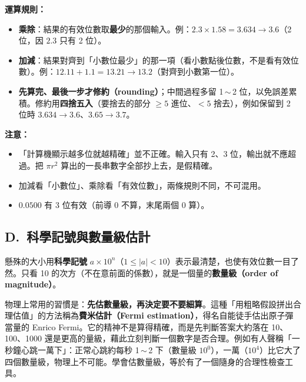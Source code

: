 \documentclass[11pt]{article}
\begin{document}
\textbf{運算規則：}
\begin{itemize}\setlength{\itemsep}{1pt}
\item \textbf{乘除}：結果的有效位數取\textbf{最少}的那個輸入。例：$2.3\times1.58=3.634\to3.6$（2 位，因 $2.3$ 只有 2 位）。
\item \textbf{加減}：結果對齊到「小數位最少」的那一項（看小數點後位數，不是看有效位數）。例：$12.11+1.1=13.21\to13.2$（對齊到小數第一位）。
\item \textbf{先算完、最後一步才修約（rounding）}；中間過程多留 1\,$\sim$\,2 位，以免誤差累積。修約用\textbf{四捨五入}（要捨去的部分 $\ge5$ 進位、$<5$ 捨去），例如保留到 2 位時 $3.634\to3.6$、$3.65\to3.7$。
\end{itemize}

\textbf{注意：}
\begin{itemize}\setlength{\itemsep}{1pt}
\item 「計算機顯示越多位就越精確」並不正確。輸入只有 2、3 位，輸出就不應超過。把 $\pi r^2$ 算出的一長串數字全部抄上去，是假精確。
\item 加減看「小數位」、乘除看「有效位數」，兩條規則不同，不可混用。
\item $0.0500$ 有 3 位有效（前導 0 不算，末尾兩個 0 算）。
\end{itemize}

\subsection*{\sffamily D.\ 科學記號與數量級估計}

懸殊的大小用\textbf{科學記號} $a\times10^{n}$（$1\le |a|<10$）表示最清楚，也使有效位數一目了然。只看 10 的次方（不在意前面的係數），就是一個量的\textbf{數量級（order of magnitude）}。

物理上常用的習慣是：\textbf{先估數量級，再決定要不要細算}。這種「用粗略假設拼出合理估值」的方法稱為\textbf{費米估計（Fermi estimation）}，得名自能徒手估出原子彈當量的 Enrico Fermi。它的精神不是算得精確，而是先判斷答案大約落在 10、100、1000 還是更高的量級，藉此立刻判斷一個數字是否合理。例如有人聲稱「一秒鐘心跳一萬下」：正常心跳約每秒 1\,$\sim$\,2 下（數量級 $10^0$），一萬（$10^4$）比它大了四個數量級，物理上不可能。學會估數量級，等於有了一個隨身的合理性檢查工具。
\end{document}
